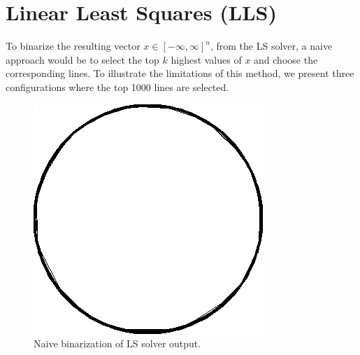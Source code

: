 \section{Linear Least Squares (LLS)}

To binarize the resulting vector \(x \in \left[-\infty, \infty\right]^{n}\), from the LS solver, a naive approach would be to select the top \(k\) highest values of \(x\) and choose the corresponding lines. To illustrate the limitations of this method, we present three configurations where the top 1000 lines are selected.

\begin{figure}[!htb]
    \centering
    \begin{minipage}{0.32\linewidth}
        \centering
        \includegraphics[width=\linewidth]{images/ls_binary/ls_rounding.png}
        \caption{Naive binarization of LS solver output.}
        \label{fig:ls_binary}
    \end{minipage}
    \hfill
    \begin{minipage}{0.32\linewidth}
        \centering

\end{minipage}
\end{figure}
